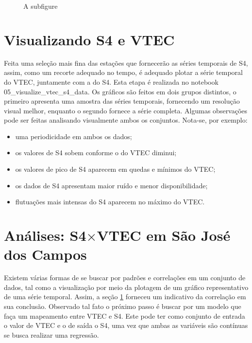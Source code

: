 \begin{figure}[h]
\centering
\makebox[\textwidth][c]{}
\label{fig:mapstationsre}
\caption{A subfigure}
\end{figure}

\section{Visualizando S4  e VTEC}\label{sec:viss4vtec}

Feita uma seleção mais fina das estações que fornecerão as séries temporais de S4, assim, como um recorte adequado no tempo, é adequado plotar a série temporal do VTEC, juntamente com a do S4. Esta etapa é realizada no notebook 05\_visualize\_vtec\_s4\_data. Os gráficos são feitos em dois grupos distintos, o primeiro apresenta uma amostra das séries temporais, fornecendo um resolução visual melhor, enquanto o segundo fornece a série completa. Algumas observações pode ser feitas analisando visualmente ambos os conjuntos. Nota-se, por exemplo:

\begin{itemize}
\item uma periodicidade em ambos os dados; 
\item os valores de S4 sobem conforme o do VTEC diminui;
\item os valores de pico de S4 aparecem em quedas e mínimos do VTEC;
\item os dados de S4 apresentam maior ruído e menor disponibilidade;
\item flutuações mais intensas do S4 aparecem no máximo do VTEC.
\end{itemize}

\section{Análises: S4$\times$VTEC em São José dos Campos}

Existem várias formas de se buscar por padrões e correlações em um conjunto de dados, tal como a visualização por meio da plotagem de um gráfico representativo de uma série temporal. Assim, a seção \ref{sec:viss4vtec} forneceu um indicativo da correlação em sua conclusão. Observado tal fato o próximo passo é buscar por um modelo que faça um mapeamento entre VTEC e S4. Este pode ter como conjunto de entrada o valor de VTEC e o de saída o S4, uma vez que ambas as variáveis são contínuas se busca realizar uma regressão. 

